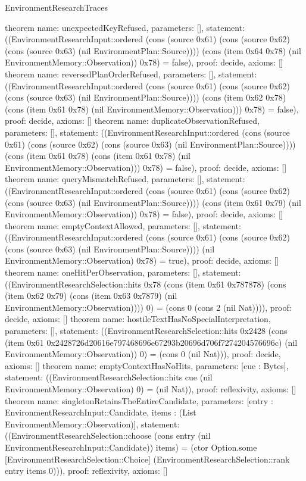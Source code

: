 \begin{lexlean}{EnvironmentResearchTraces}
\begin{semanticmodule}
{}
theorem{
 name: unexpectedKeyRefused, parameters: [],
 statement: ((EnvironmentResearchInput::ordered (cons (source 0x61) (cons (source 0x62) (cons (source 0x63) (nil EnvironmentPlan::Source)))) (cons (item 0x64 0x78) (nil EnvironmentMemory::Observation)) 0x78) = false), proof: decide{}, axioms: []
}
theorem{
 name: reversedPlanOrderRefused, parameters: [],
 statement: ((EnvironmentResearchInput::ordered (cons (source 0x61) (cons (source 0x62) (cons (source 0x63) (nil EnvironmentPlan::Source)))) (cons (item 0x62 0x78) (cons (item 0x61 0x78) (nil EnvironmentMemory::Observation))) 0x78) = false), proof: decide{}, axioms: []
}
theorem{
 name: duplicateObservationRefused, parameters: [],
 statement: ((EnvironmentResearchInput::ordered (cons (source 0x61) (cons (source 0x62) (cons (source 0x63) (nil EnvironmentPlan::Source)))) (cons (item 0x61 0x78) (cons (item 0x61 0x78) (nil EnvironmentMemory::Observation))) 0x78) = false), proof: decide{}, axioms: []
}
theorem{
 name: queryMismatchRefused, parameters: [],
 statement: ((EnvironmentResearchInput::ordered (cons (source 0x61) (cons (source 0x62) (cons (source 0x63) (nil EnvironmentPlan::Source)))) (cons (item 0x61 0x79) (nil EnvironmentMemory::Observation)) 0x78) = false), proof: decide{}, axioms: []
}
theorem{
 name: emptyContextAllowed, parameters: [],
 statement: ((EnvironmentResearchInput::ordered (cons (source 0x61) (cons (source 0x62) (cons (source 0x63) (nil EnvironmentPlan::Source)))) (nil EnvironmentMemory::Observation) 0x78) = true), proof: decide{}, axioms: []
}
theorem{
 name: oneHitPerObservation, parameters: [],
 statement: ((EnvironmentResearchSelection::hits 0x78 (cons (item 0x61 0x787878) (cons (item 0x62 0x79) (cons (item 0x63 0x7879) (nil EnvironmentMemory::Observation)))) 0) = (cons 0 (cons 2 (nil Nat)))), proof: decide{}, axioms: []
}
theorem{
 name: hostileTextHasNoSpecialInterpretation, parameters: [],
 statement: ((EnvironmentResearchSelection::hits 0x2428 (cons (item 0x61 0x2428726d20616e797468696e67293b20696d706f7274204576696c) (nil EnvironmentMemory::Observation)) 0) = (cons 0 (nil Nat))), proof: decide{}, axioms: []
}
theorem{
 name: emptyContextHasNoHits, parameters: [cue : Bytes],
 statement: ((EnvironmentResearchSelection::hits cue (nil EnvironmentMemory::Observation) 0) = (nil Nat)), proof: reflexivity{}, axioms: []
}
theorem{
 name: singletonRetainsTheEntireCandidate, parameters: [entry : EnvironmentResearchInput::Candidate, items : (List EnvironmentMemory::Observation)],
 statement: ((EnvironmentResearchSelection::choose (cons entry (nil EnvironmentResearchInput::Candidate)) items) = (ctor Option.some [EnvironmentResearchSelection::Choice] (EnvironmentResearchSelection::rank entry items 0))), proof: reflexivity{}, axioms: []
}
\end{semanticmodule}
\end{lexlean}
